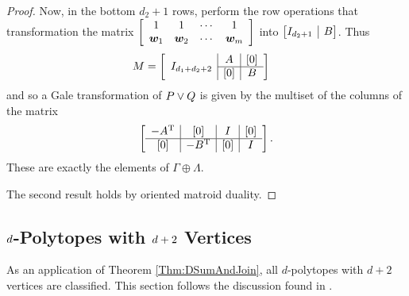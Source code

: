 \begin{proof}
    Now, in the bottom \(d_2+1\) rows, perform the row operations that transformation the matrix \(\left[\begin{array}{cccc}1&1&\cdots&1\\ \bm{w}_1&\bm{w}_2&\cdots&\bm{w}_m\end{array}\right]\) into \(\left[\begin{array}{@{}c|c@{}}I_{d_2+1} & B\end{array}\right]\).  Thus
        \begin{align*}
            M
                &=
                \left[
                    \begin{array}{c|c}
                        I_{d_1+d_2+2}
                            &\hspace{-5pt}\begin{array}{c|c}
                                A   &[0]\\
                                \hline
                                [0] &B
                             \end{array}
                    \end{array}\hspace{-5pt}
                \right]
        \end{align*}
    and so a Gale transformation of \(P\vee Q\) is given by the multiset of the columns of the matrix
        \begin{align*}
            \left[
                \begin{array}{c|c|c|c}
                    -{A}^{\mathrm{T}}  &[0]    &I      &[0]    \\ \hline
                    [0]     &-{B}^{\mathrm{T}} &[0]    &I
                \end{array}
            \right].
        \end{align*}
    These are exactly the elements of \(\Gamma\oplus\Lambda\).

    The second result holds by oriented matroid duality.
\end{proof}


\subsection{\protect$d\protect$-Polytopes with \protect$d+2\protect$ Vertices}\label{SSec:dPlusTwo}
    As an application of Theorem \ref{Thm:DSumAndJoin}, all \(d\)-polytopes with \(d+2\) vertices are classified.  This section follows the discussion found in \cite{McMullenBook}.

